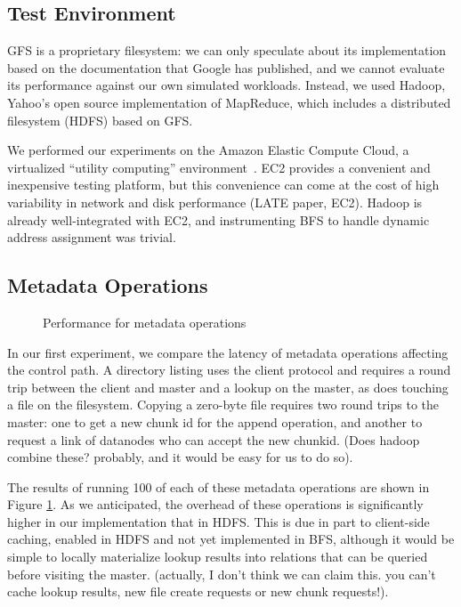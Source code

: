\documentclass{article}
\begin{document}
\subsection{Test Environment}
GFS is a proprietary filesystem: we can only speculate about its
implementation based on the documentation that Google has published,
and we cannot evaluate its performance against our own simulated
workloads.  Instead, we used Hadoop, Yahoo's open source
implementation of MapReduce, which includes a distributed filesystem
(HDFS) based on GFS.

We performed our experiments on the Amazon Elastic Compute Cloud, a
virtualized ``utility computing'' environment~\cite{amazon-ec2}.  EC2
provides a convenient and inexpensive testing platform, but this
convenience can come at the cost of high variability in network and
disk performance (LATE paper, EC2).  Hadoop is already well-integrated
with EC2, and instrumenting BFS to handle dynamic address assignment
was trivial.

\subsection{Metadata Operations}
\begin{figure}
\centering
{}
\caption{Performance for metadata operations}
\label{fig:metadata-perf}
\end{figure}

In our first experiment, we compare the latency of metadata operations
affecting the control path.  A directory listing uses the client
protocol and requires a round trip between the client and master and a
lookup on the master, as does touching a file on the filesystem.
Copying a zero-byte file requires two round trips to the master: one
to get a new chunk id for the append operation, and another to request
a link of datanodes who can accept the new chunkid.  (Does hadoop
combine these?  probably, and it would be easy for us to do so).

The results of running 100 of each of these metadata operations are
shown in Figure \ref{fig:metadata-perf}.  As we anticipated, the
overhead of these operations is significantly higher in our
implementation that in HDFS.  This is due in part to client-side
caching, enabled in HDFS and not yet implemented in BFS, although it
would be simple to locally materialize lookup results into relations
that can be queried before visiting the master. (actually, I don't
think we can claim this.  you can't cache lookup results, new file
create requests or new chunk requests!).
\end{document}
